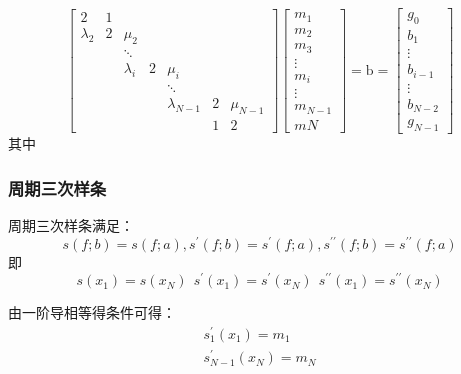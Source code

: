 \documentclass[a4paper]{article}
\begin{document}
\begin{equation}
\begin{bmatrix}2&1
\\\lambda_2&2&\mu_2
\\&&\ddots\\&&\lambda_i&2&\mu_i\\&&&&\ddots\\&&&&\lambda_{N-1}&2&\mu_{N-1}\\&&&&&1&2\end{bmatrix}\begin{bmatrix}m_1\\ m_2\\m_3\\\vdots\\m_i\\\vdots\\m_{N-1}\\mN\end{bmatrix}=\mathrm{b} = \begin{bmatrix}
    g_0 \\
    b_1 \\
    \vdots \\
    b_{i -1}\\
    \vdots \\
    b_{N-2}\\
    g_{N-1}
\end{bmatrix}
\end{equation}
其中

\subsubsection{周期三次样条}
周期三次样条满足：
\begin{equation}
    s(f;b) = s(f;a),s^\prime (f;b) = s^\prime (f;a),s^{\prime\prime} (f;b) = s^{\prime\prime} (f;a)
\end{equation}
即
\begin{equation}
    s(x_1) = s(x_N) \ \ s^\prime(x_1) = s^\prime(x_N) \ \ s^{\prime\prime}(x_1) = s^{\prime\prime}(x_N)
\end{equation}

由一阶导相等得条件可得：
\begin{gather}
    s_1^\prime(x_1) = m_1 \\
    s_{N-1}^\prime(x_N) = m_N 
\end{gather}
\end{document}
